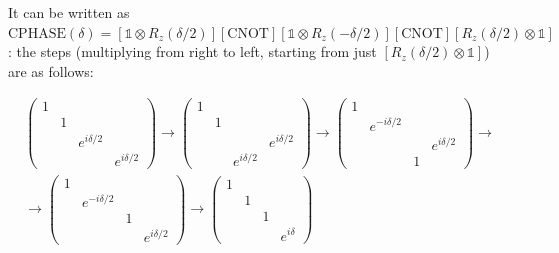 \documentclass[main.tex]{subfiles}
\begin{document}
\begin{bluebox}
It can be written as \(\text{CPHASE} (\delta) = [\mathbb 1 \otimes R_z(\delta/2)] [\text{CNOT}] [\mathbb 1 \otimes R_z(-\delta/2)] [\text{CNOT}] [ R_z(\delta/2) \otimes\mathbb 1 ]\): the steps  (multiplying from right to left, starting from just \([ R_z(\delta/2) \otimes\mathbb 1 ]\)) are as follows:

\begin{multline}
    \begin{pmatrix}
    1   &   &   &  \\
       & 1  &   &  \\
       &   & e^{i \delta/2}  &  \\
       &   &   & e^{i \delta /2}
    \end{pmatrix}
\rightarrow
    \begin{pmatrix}
    1   &   &   &  \\
       & 1  &   &  \\
       &   &  & e^{i \delta/2}  \\
       &   &   e^{i \delta /2} &
    \end{pmatrix}
\rightarrow
    \begin{pmatrix}
    1   &   &   &  \\
       & e^{-i \delta/2}  &   &  \\
       &   &  & e^{i \delta/2}  \\
       &   &   1 &
    \end{pmatrix}
\rightarrow
\\
\rightarrow
    \begin{pmatrix}
    1   &   &   &  \\
       & e^{-i \delta/2}  &   &  \\
       &   &  1 &  \\
       &   &    & e^{i \delta/2}
    \end{pmatrix}
\rightarrow
    \begin{pmatrix}
    1   &   &   &  \\
       & 1  &   &  \\
       &   &  1 &  \\
       &   &    & e^{i \delta}
    \end{pmatrix}
\end{multline}
\end{bluebox}
\end{document}
